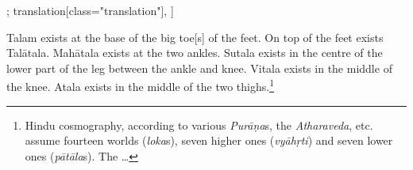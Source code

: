 \begin{alignment}[
  texts=edition[class="edition"];
  translation[class="translation"],
  ]
\begin{translation}
\begin{tlate}
Talam exists at the base of the big toe[s] of the feet. On top of the feet exists Talātala. Mahātala exists at the two ankles. Sutala exists in the centre of the lower part of the leg between the ankle and knee. Vitala exists in the middle of the knee. Atala exists in the middle of the two thighs.\footnote{Hindu cosmography, according to various \textit{Purāṇa}s, the \textit{Atharaveda}, etc. assume fourteen worlds (\textit{loka}s), seven higher ones (\textit{vyāhṛti}) and seven lower ones (\textit{pātāla}s). The \ldots}
   \end{tlate}
  \end{translation}
\end{alignment}
\pagebreak %

